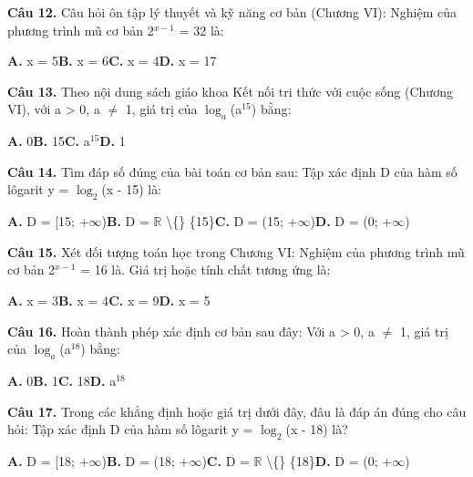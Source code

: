 \documentclass[11pt,a4paper]{article}
\begin{document}
\textbf{\color{primary} Câu 12.} Câu hỏi ôn tập lý thuyết và kỹ năng cơ bản (Chương VI): Nghiệm của phương trình mũ cơ bản 2$^{x - 1}$ = 32 là:\par
\hspace*{1.5em}\textbf{A.} x = 5\quad\quad \textbf{B.} x = 6\quad\quad \textbf{C.} x = 4\quad\quad \textbf{D.} x = 17\par\vspace{2pt}
\textbf{\color{primary} Câu 13.} Theo nội dung sách giáo khoa Kết nối tri thức với cuộc sống (Chương VI), với a > 0, a $\ne$ 1, giá trị của $\log_a$(a$^{15}$) bằng:\par
\hspace*{1.5em}\textbf{A.} 0\quad\quad \textbf{B.} 15\quad\quad \textbf{C.} a$^{15}$\quad\quad \textbf{D.} 1\par\vspace{2pt}
\textbf{\color{primary} Câu 14.} Tìm đáp số đúng của bài toán cơ bản sau: Tập xác định D của hàm số lôgarit y = $\log_2$(x - 15) là:\par
\hspace*{1.5em}\textbf{A.} D = [15; +$\infty$)\quad\quad \textbf{B.} D = $\mathbb{R}$ \textbackslash\{\} \{15\}\quad\quad \textbf{C.} D = (15; +$\infty$)\quad\quad \textbf{D.} D = (0; +$\infty$)\par\vspace{2pt}
\textbf{\color{primary} Câu 15.} Xét đối tượng toán học trong Chương VI: Nghiệm của phương trình mũ cơ bản 2$^{x - 1}$ = 16 là. Giá trị hoặc tính chất tương ứng là:\par
\hspace*{1.5em}\textbf{A.} x = 3\quad\quad \textbf{B.} x = 4\quad\quad \textbf{C.} x = 9\quad\quad \textbf{D.} x = 5\par\vspace{2pt}
\textbf{\color{primary} Câu 16.} Hoàn thành phép xác định cơ bản sau đây: Với a > 0, a $\ne$ 1, giá trị của $\log_a$(a$^{18}$) bằng:\par
\hspace*{1.5em}\textbf{A.} 0\quad\quad \textbf{B.} 1\quad\quad \textbf{C.} 18\quad\quad \textbf{D.} a$^{18}$\par\vspace{2pt}
\textbf{\color{primary} Câu 17.} Trong các khẳng định hoặc giá trị dưới đây, đâu là đáp án đúng cho câu hỏi: Tập xác định D của hàm số lôgarit y = $\log_2$(x - 18) là?\par
\hspace*{1.5em}\textbf{A.} D = [18; +$\infty$)\quad\quad \textbf{B.} D = (18; +$\infty$)\quad\quad \textbf{C.} D = $\mathbb{R}$ \textbackslash\{\} \{18\}\quad\quad \textbf{D.} D = (0; +$\infty$)\par\vspace{2pt}
\end{document}
